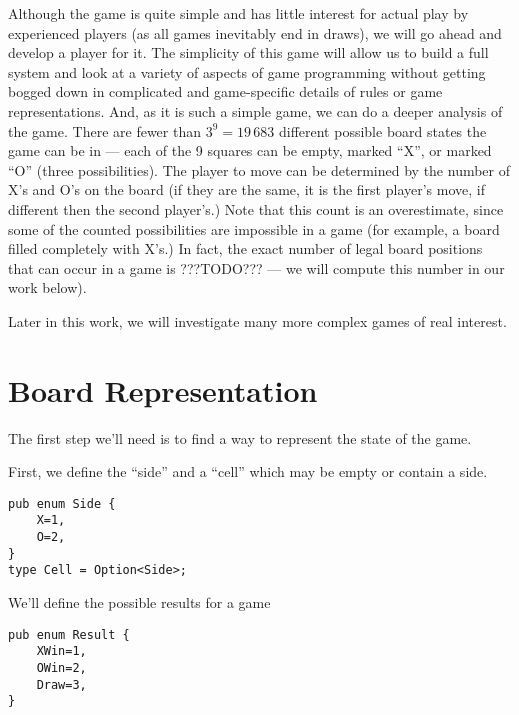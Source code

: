 \documentclass[10pt,dvipdfmx,letterpaper]{report}
\begin{document}
Although the game is quite simple and has little interest for actual play by experienced players
(as all games inevitably end in draws), we will go ahead and develop a player for it.
The simplicity of this game will allow us to build a full system and look at a variety of aspects of
game programming without getting bogged down in complicated and game-specific details
of rules or game representations.  And, as it is such a simple game, we can
do a deeper analysis of the game.  There are fewer than $3^9=19\,683$ different
possible board states the game can be in --- each of the 9 squares can be empty,
marked ``X'', or marked ``O'' (three possibilities).  The player to move can be
determined by the number of X's and O's on the board (if they are the same, it is
the first player's move, if different then the second player's.)  Note that this count
is an overestimate, since some of the counted possibilities are impossible in a game
(for example, a board filled completely with X's.)  In fact, the exact number of
legal board positions that can occur in a game is ???TODO??? --- we will compute this number
in our work below).

Later in this work, we will investigate many more complex games of real interest.

\section{Board Representation}
The first step we'll need is to find a way to represent the state of the game.

First, we define the ``side'' and a ``cell'' which may be empty or contain a side.
{\scriptsize
\begin{verbatim}
pub enum Side {
    X=1,
    O=2,
}
type Cell = Option<Side>;
\end{verbatim}
}

We'll define the possible results for a game
{\scriptsize
\begin{verbatim}
pub enum Result {
    XWin=1,
    OWin=2,
    Draw=3,
}
\end{verbatim}}
\end{document}
